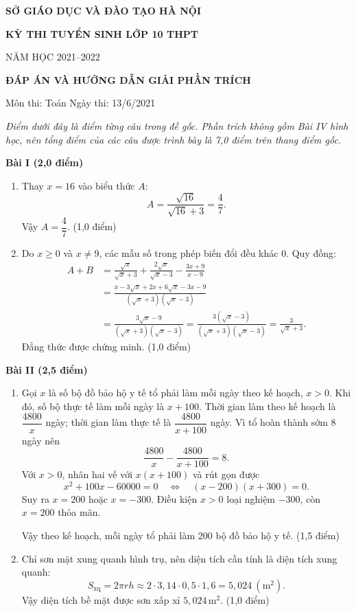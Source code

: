 \documentclass[12pt,a4paper]{article}
\begin{document}
\begin{center}
{\large\bfseries SỞ GIÁO DỤC VÀ ĐÀO TẠO HÀ NỘI}\par
{\Large\bfseries KỲ THI TUYỂN SINH LỚP 10 THPT}\par
{\large NĂM HỌC 2021--2022}\par
{\bfseries ĐÁP ÁN VÀ HƯỚNG DẪN GIẢI PHẦN TRÍCH}\par
Môn thi: Toán \qquad Ngày thi: 13/6/2021
\end{center}

\textit{Điểm dưới đây là điểm từng câu trong đề gốc. Phần trích không gồm Bài IV hình học, nên tổng điểm của các câu được trình bày là 7,0 điểm trên thang điểm gốc.}

\textbf{Bài I (2,0 điểm)}

\begin{enumerate}[label=\arabic*)]
  \item Thay $x=16$ vào biểu thức $A$:
  \[
  A=\frac{\sqrt{16}}{\sqrt{16}+3}=\frac{4}{7}.
  \]
  Vậy $A=\dfrac47$. \hfill (1,0 điểm)

  \item Do $x\geq0$ và $x\neq9$, các mẫu số trong phép biến đổi đều khác $0$. Quy đồng:
  \begin{align*}
  A+B
  &=\frac{\sqrt{x}}{\sqrt{x}+3}
    +\frac{2\sqrt{x}}{\sqrt{x}-3}
    -\frac{3x+9}{x-9}\\
  &=\frac{x-3\sqrt{x}+2x+6\sqrt{x}-3x-9}
          {(\sqrt{x}+3)(\sqrt{x}-3)}\\
  &=\frac{3\sqrt{x}-9}{(\sqrt{x}+3)(\sqrt{x}-3)}
   =\frac{3(\sqrt{x}-3)}{(\sqrt{x}+3)(\sqrt{x}-3)}
   =\frac{3}{\sqrt{x}+3}.
  \end{align*}
  Đẳng thức được chứng minh. \hfill (1,0 điểm)
\end{enumerate}

\textbf{Bài II (2,5 điểm)}

\begin{enumerate}[label=\arabic*)]
  \item Gọi $x$ là số bộ đồ bảo hộ y tế tổ phải làm mỗi ngày theo kế hoạch, $x>0$. Khi đó, số bộ thực tế làm mỗi ngày là $x+100$. Thời gian làm theo kế hoạch là $\dfrac{4800}{x}$ ngày; thời gian làm thực tế là $\dfrac{4800}{x+100}$ ngày. Vì tổ hoàn thành sớm 8 ngày nên
  \[
  \frac{4800}{x}-\frac{4800}{x+100}=8.
  \]
  Với $x>0$, nhân hai vế với $x(x+100)$ và rút gọn được
  \[
  x^2+100x-60000=0
  \quad\Longleftrightarrow\quad
  (x-200)(x+300)=0.
  \]
  Suy ra $x=200$ hoặc $x=-300$. Điều kiện $x>0$ loại nghiệm $-300$, còn $x=200$ thỏa mãn.\par
  Vậy theo kế hoạch, mỗi ngày tổ phải làm 200 bộ đồ bảo hộ y tế. \hfill (1,5 điểm)

  \item Chỉ sơn mặt xung quanh hình trụ, nên diện tích cần tính là diện tích xung quanh:
  \[
  S_{\mathrm{xq}}=2\pi rh
  \approx 2\cdot3{,}14\cdot0{,}5\cdot1{,}6
  =5{,}024\ (\mathrm{m}^2).
  \]
  Vậy diện tích bề mặt được sơn xấp xỉ $5{,}024\,\mathrm{m}^2$. \hfill (1,0 điểm)
\end{enumerate}
\end{document}
